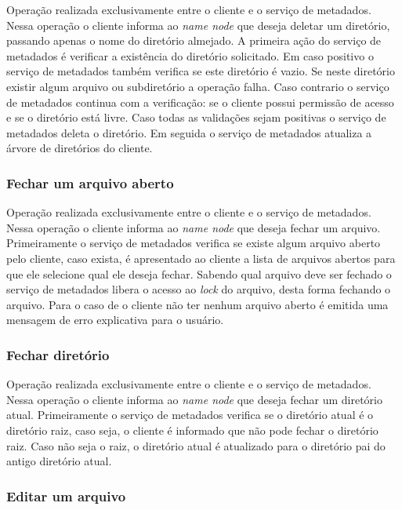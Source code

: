 Operação realizada exclusivamente entre o cliente e o serviço de metadados. Nessa operação o cliente informa ao \textit{name node} que deseja deletar um diretório, passando apenas o nome do diretório almejado. A primeira ação do serviço de metadados é verificar a existência do diretório solicitado. Em caso positivo o serviço de metadados também verifica se este diretório é vazio. Se neste diretório existir algum arquivo ou subdiretório a operação falha. Caso contrario o serviço de metadados continua com a verificação: se o cliente possui permissão de acesso e se o diretório está livre. Caso todas as validações sejam positivas o serviço de metadados deleta o diretório. Em seguida o serviço de metadados atualiza a árvore de diretórios do cliente.
\\

\subsubsection{Fechar um arquivo aberto}

Operação realizada exclusivamente entre o cliente e o serviço de metadados. Nessa operação o cliente informa ao \textit{name node} que deseja fechar um arquivo. Primeiramente o serviço de metadados verifica se existe algum arquivo aberto pelo cliente, caso exista, é apresentado ao cliente a lista de arquivos abertos para que ele selecione qual ele deseja fechar. Sabendo qual arquivo deve ser fechado o serviço de metadados libera o acesso ao \textit{lock} do arquivo, desta forma fechando o arquivo. Para o caso de o cliente não ter nenhum arquivo aberto é emitida uma mensagem de erro explicativa para o usuário.
\\

\subsubsection{Fechar diretório}

Operação realizada exclusivamente entre o cliente e o serviço de metadados. Nessa operação o cliente informa ao \textit{name node} que deseja fechar um diretório atual. Primeiramente o serviço de metadados verifica se o diretório atual é o diretório raiz, caso seja, o cliente é informado que não pode fechar o diretório raiz. Caso não seja o raiz, o diretório atual é atualizado para o diretório pai do antigo diretório atual.
\\

\subsubsection{Editar um arquivo}

